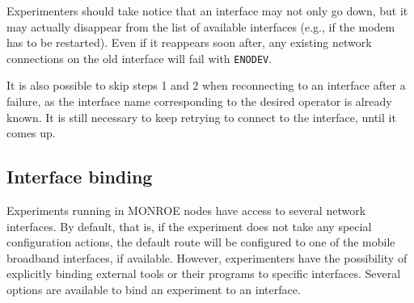 \documentclass[a4paper,10pt]{article}
\newcommand{\monroe}{MONROE}
\newcommand{\identifier}[1]{{\texttt{\small{#1}}}}
\begin{document}
Experimenters should take notice that an interface may not only go down, but it may actually disappear from the list of available interfaces (e.g., if the modem has to be restarted).
Even if it reappears soon after, any existing network connections on the old interface will fail with \identifier{ENODEV}. 
	
It is also possible to skip steps 1 and 2 when reconnecting to an interface after a failure, as the interface name corresponding to the desired operator is already known.
It is still necessary to keep retrying to connect to the interface, until it comes up.

\subsection{Interface binding}
\label{subsec:binding}

Experiments running in \monroe{} nodes have access to several network interfaces.
By default, that is, if the experiment does not take any special configuration actions, the default route will be configured to one of the mobile broadband interfaces, if available.
However, experimenters have the possibility of explicitly binding external tools or their programs to specific interfaces.
Several options are available to bind an experiment to an interface.
\end{document}
